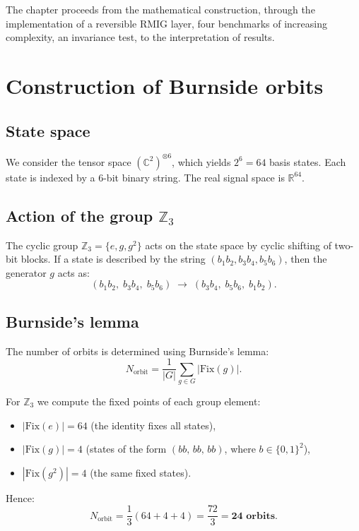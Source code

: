 \documentclass[11pt,a4paper]{report}
\begin{document}
The chapter proceeds from the mathematical construction, through the implementation of a reversible RMIG layer, four benchmarks of increasing complexity, an invariance test, to the interpretation of results.


\section{Construction of Burnside orbits}

\subsection{State space}

We consider the tensor space $(\mathbb{C}^2)^{\otimes 6}$, which yields $2^6 = 64$ basis states. Each state is indexed by a 6-bit binary string. The real signal space is $\mathbb{R}^{64}$.

\subsection{Action of the group $\mathbb{Z}_3$}

The cyclic group $\mathbb{Z}_3 = \{e, g, g^2\}$ acts on the state space by cyclic shifting of two-bit blocks. If a state is described by the string $(b_1 b_2, b_3 b_4, b_5 b_6)$, then the generator $g$ acts as:
\[
(b_1 b_2,\; b_3 b_4,\; b_5 b_6) \;\longrightarrow\; (b_3 b_4,\; b_5 b_6,\; b_1 b_2).
\]

\subsection{Burnside's lemma}

The number of orbits is determined using Burnside's lemma:
\[
N_{\text{orbit}} = \frac{1}{|G|}\sum_{g\in G}|\text{Fix}(g)|.
\]

For $\mathbb{Z}_3$ we compute the fixed points of each group element:
\begin{itemize}
\item $|\text{Fix}(e)| = 64$ (the identity fixes all states),
\item $|\text{Fix}(g)| = 4$ (states of the form $(bb,\, bb,\, bb)$, where $b\in\{0,1\}^2$),
\item $|\text{Fix}(g^2)| = 4$ (the same fixed states).
\end{itemize}

Hence:
\[
N_{\text{orbit}} = \frac{1}{3}(64 + 4 + 4) = \frac{72}{3} = \mathbf{24\text{ orbits}}.
\]
\end{document}
